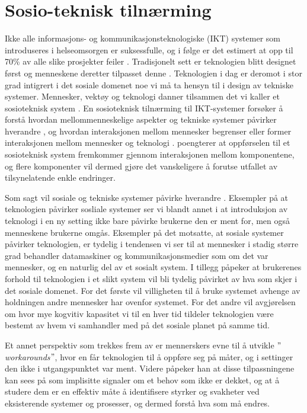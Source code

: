 \section{Sosio-teknisk tilnærming}
\label{section:sosioteknisk}

Ikke alle informasjons- og kommunikasjonsteknologiske (IKT) systemer som introduseres i helseomsorgen er suksessfulle, og i følge \citet{FITT} er det estimert at opp til 70\% av alle slike prosjekter feiler \citep{Coiera07}. Tradisjonelt sett er teknologien blitt designet først og menneskene deretter tilpasset denne \citep{Appelbaum97}.
Teknologien i dag er deromot i stor grad intigrert i det sosiale domenet noe vi må ta hensyn til i design av tekniske systemer. Mennesker, vektøy og teknologi danner tilsammen det vi kaller et sosioteknisk system \citep{Coiera04}.
En sosioteknisk tilnærming til IKT-systemer forsøker å forstå hvordan mellommenneskelige aspekter og tekniske systemer påvirker hverandre \citep{Coiera04}, og hvordan interaksjonen mellom mennesker begrenser eller former interaksjonen mellom mennesker og teknologi \citep{Coiera07}. \citet{Coiera04} poengterer at oppførselen til et sosioteknisk system fremkommer gjennom interaksjonen mellom komponentene, og flere komponenter vil dermed gjøre det vanskeligere å forutse utfallet av tilsynelatende enkle endringer.

\noindent
Som sagt vil sosiale og tekniske systemer påvirke hverandre \citep{Coiera04}. Eksempler på at teknologien påvirker sosliale systemer ser vi blandt annet i at introduksjon av teknologi i en ny setting ikke bare påvirke brukerne den er ment for, men også menneskene brukerne omgås.
Eksempler på det motsatte, at sosiale systemer påvirker teknologien, er tydelig i tendensen vi ser til at mennesker i stadig større grad behandler datamaskiner og kommunikasjonsmedier som om det var mennesker, og en naturlig del av et sosialt system. I tillegg påpeker \citet{Coiera07} at brukerenes forhold til teknologien i et slikt system vil bli tydelig påvirket av hva som skjer i det sosiale domenet. For det første vil villigheten til å bruke systemet avhenge av holdningen andre mennesker har ovenfor systemet. For det andre vil avgjørelsen om hvor mye kogvitiv kapasitet vi til en hver tid tildeler teknologien være bestemt av hvem vi samhandler med på det sosiale planet på samme tid.

\noindent
Et annet perspektiv som trekkes frem av \citet{Coiera07} er mennerskers evne til å utvikle \emph{$"$workarounds$"$}, hvor en får teknologien til å oppføre seg på måter, og i settinger den ikke i utgangspunktet var ment. Videre påpeker han at disse tilpassningene kan sees på som  implisitte signaler om et behov som ikke er dekket, og at å studere dem er en effektiv måte å identifisere styrker og svakheter ved eksisterende systemer og prosesser, og dermed forstå hva som må endres. 

